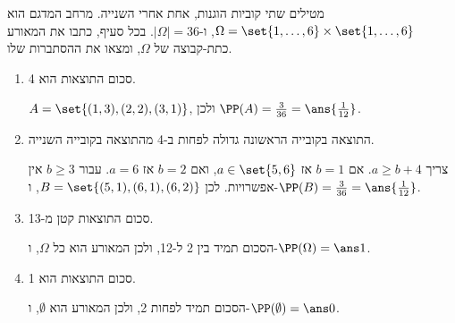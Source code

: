 מטילים שתי קוביות הוגנות, אחת אחרי השנייה. מרחב המדגם הוא $\Omega=\set{1,\dots,6}\times\set{1,\dots,6}$, ו-$|\Omega|=36$. בכל סעיף, כתבו את המאורע כתת-קבוצה של $\Omega$, ומצאו את ההסתברות שלו.
\begin{enumerate}
\item סכום התוצאות הוא 4.
\begin{solbox}
$A=\set{(1,3),(2,2),(3,1)}$, ולכן $\PP(A)=\frac3{36}=\ans{\frac1{12}}$.
\end{solbox}
\item התוצאה בקובייה הראשונה גדולה לפחות ב-4 מהתוצאה בקובייה השנייה.
\begin{solbox}
צריך $a\ge b+4$. אם $b=1$ אז $a\in\set{5,6}$, ואם $b=2$ אז $a=6$. עבור $b\ge3$ אין אפשרויות. לכן $B=\set{(5,1),(6,1),(6,2)}$, ו-$\PP(B)=\frac3{36}=\ans{\frac1{12}}$.
\end{solbox}
\item סכום התוצאות קטן מ-13.
\begin{solbox}
הסכום תמיד בין 2 ל-12, ולכן המאורע הוא כל $\Omega$, ו-$\PP(\Omega)=\ans1$.
\end{solbox}
\item סכום התוצאות הוא 1.
\begin{solbox}
הסכום תמיד לפחות 2, ולכן המאורע הוא $\emptyset$, ו-$\PP(\emptyset)=\ans0$.
\end{solbox}
\end{enumerate}
